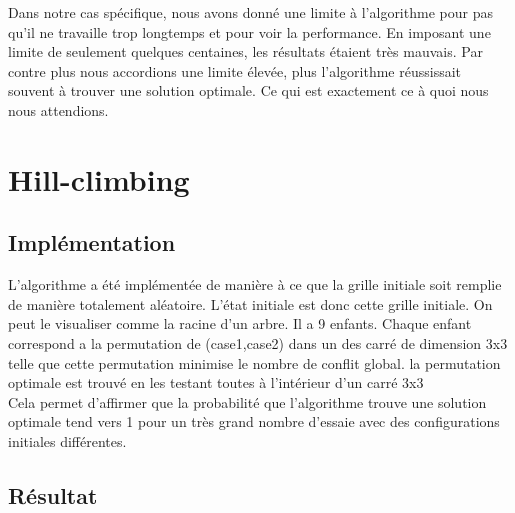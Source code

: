 \documentclass[a4paper,10pt]{article}
\begin{document}
Dans notre cas spécifique, nous avons donné une limite à l'algorithme pour pas qu'il ne travaille trop longtemps et pour voir la performance. En imposant une limite de seulement quelques centaines, les résultats étaient très mauvais. Par contre plus nous accordions une limite élevée, plus l'algorithme réussissait souvent à trouver une solution optimale. Ce qui est exactement ce à quoi nous nous attendions.

\section{Hill-climbing}

\subsection{Implémentation}
L'algorithme a été implémentée de manière à ce que la grille initiale soit remplie de manière totalement aléatoire. L'état initiale est donc cette grille initiale. On peut le visualiser comme la racine d'un arbre. Il a 9 enfants. Chaque enfant correspond a la permutation de (case1,case2) dans un des carré de dimension 3x3 telle que cette permutation minimise le nombre de conflit global. la permutation optimale est trouvé en les testant toutes à l'intérieur d'un carré 3x3\\


Cela permet d'affirmer que la probabilité que l'algorithme trouve une solution optimale tend vers 1 pour un très grand nombre d'essaie avec des configurations initiales différentes.

\subsection{Résultat}
\end{document}
